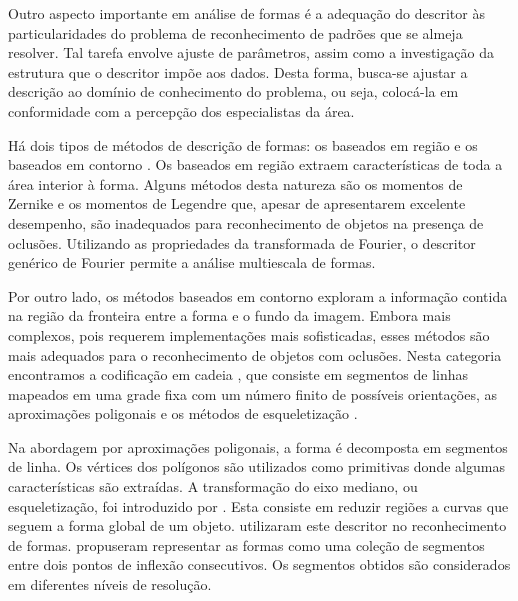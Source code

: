 Outro aspecto importante em análise de formas é a adequação do descritor às particularidades do problema de reconhecimento de padrões que se almeja resolver. Tal tarefa envolve ajuste de parâmetros, assim como a investigação da estrutura que o descritor impõe aos dados. Desta forma, busca-se ajustar a descrição ao domínio de conhecimento do problema, ou seja, colocá-la em conformidade com a percepção dos especialistas da área. 

Há dois tipos de métodos de descrição de formas: os baseados em região e os baseados em contorno \cite{Zhang:2004}. Os baseados em região extraem características de toda a área interior à forma. Alguns métodos desta natureza são os momentos de Zernike \cite{Kim:2000} e os momentos de Legendre \cite{Yang:2006} que, apesar de apresentarem excelente desempenho, são inadequados para reconhecimento de objetos na presença de oclusões. Utilizando as propriedades da transformada de Fourier, o descritor genérico de Fourier \cite{Zhang:2002} permite a análise multiescala de formas.

Por outro lado, os métodos baseados em contorno exploram a informação contida na região da fronteira entre a forma e o fundo da imagem. Embora mais complexos, pois requerem implementações mais sofisticadas, esses métodos são mais adequados para o reconhecimento de objetos com oclusões. Nesta categoria encontramos a codificação em cadeia \cite[p~337]{Costa:2009}, que consiste em segmentos de linhas mapeados em uma grade fixa com um número finito de possíveis orientações, as aproximações poligonais \cite[p~340--351]{Costa:2009} e os métodos de esqueletização \cite[p~394--400]{Costa:2009}. 

Na abordagem por aproximações poligonais, a forma é decomposta em segmentos de linha. Os vértices dos polígonos são utilizados como primitivas donde algumas características são extraídas. A transformação do eixo mediano, ou esqueletização, foi introduzido por . Esta consiste em reduzir regiões a curvas que seguem a forma global de um objeto.  utilizaram este descritor no reconhecimento de formas.  propuseram representar as formas como uma coleção de segmentos entre dois pontos de inflexão consecutivos. Os segmentos obtidos são considerados em diferentes níveis de resolução. 


